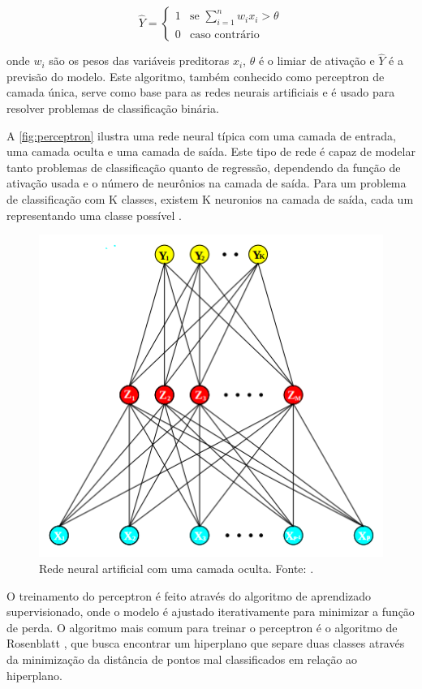 \begin{equation}
    \hat{Y} = 
    \begin{cases}
        1 & \text{se } \sum_{i=1}^{n} w_i x_i > \theta \\
        0 & \text{caso contrário}
    \end{cases}
\end{equation}

onde $w_i$ são os pesos das variáveis preditoras $x_i$, $\theta$ é o limiar de ativação e $\hat{Y}$ é a previsão do modelo. Este algoritmo, também conhecido como perceptron de camada única, serve como base para as redes neurais artificiais e é usado para resolver problemas de classificação binária.

A \autoref{fig:perceptron} ilustra uma rede neural típica com uma camada de entrada, uma camada oculta e uma camada de saída. Este tipo de rede é capaz de modelar tanto problemas de classificação quanto de regressão, dependendo da função de ativação usada e o número de neurônios na camada de saída. Para um problema de classificação com K classes, existem K neuronios na camada de saída, cada um representando uma classe possível \citep{James2000}.

\begin{figure}
    \centering
    \includegraphics[width=0.5\linewidth]{figs/perceptron-network.png}
    \caption{Rede neural artificial com uma camada oculta. Fonte: \cite{James2000}.}
    \label{fig:perceptron}
\end{figure}


O treinamento do perceptron é feito através do algoritmo de aprendizado supervisionado, onde o modelo é ajustado iterativamente para minimizar a função de perda. O algoritmo mais comum para treinar o perceptron é o algoritmo de Rosenblatt \citep{Rosenblatt1958}, que busca encontrar um hiperplano que separe duas classes através da minimização da distância de pontos mal classificados em relação ao hiperplano.

